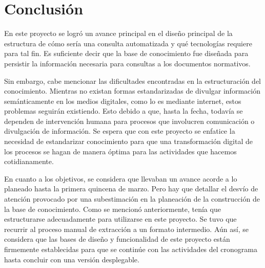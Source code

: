 \chapter{Conclusión}

En este proyecto se logró un avance principal en el diseño principal de la estructura de cómo sería una consulta automatizada y qué tecnologías requiere para tal fin. Es suficiente decir que la base de conocimiento fue diseñada para persistir la información necesaria para consultas a los documentos normativos.

Sin embargo, cabe mencionar las dificultades encontradas en la estructuración del conocimiento. Mientras no existan formas estandarizadas de divulgar información semánticamente en los medios digitales, como lo es mediante internet, estos problemas seguirán existiendo. Esto debido a que, hasta la fecha, todavía se dependen de intervención humana para procesos que involucren comunicación o divulgación de información. Se espera que con este proyecto se enfatice la necesidad de estandarizar conocimiento para que una transformación digital de los procesos se hagan de manera óptima para las actividades que hacemos cotidianamente.

En cuanto a los objetivos, se considera que llevaban un avance acorde a lo planeado hasta la primera quincena de marzo. Pero hay que detallar el desvío de atención provocado por una subestimación en la planeación de la construcción de la base de conocimiento. Como se mencionó anteriormente, tenía que estructurarse adecuadamente para utilizarse en este proyecto. Se tuvo que recurrir al proceso manual de extracción a un formato intermedio. Aún así, se considera que las bases de diseño y funcionalidad de este proyecto están firmemente establecidas para que se continúe con las actividades del cronograma hasta concluir con una versión desplegable.